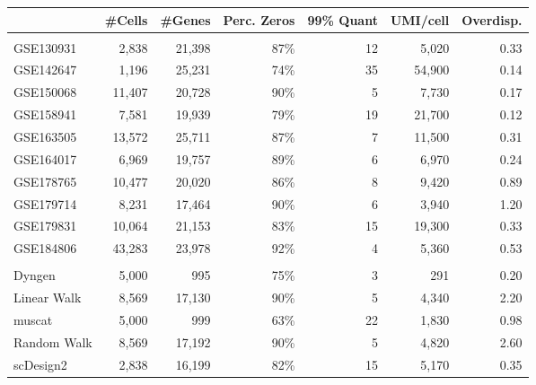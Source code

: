 \centering
\begin{tabular}[t]{lrrrrrr}
\toprule
  & \#Cells & \#Genes & Perc.
Zeros & 99\%
Quant & UMI/cell & Overdisp.\\
\midrule
\addlinespace[0mm]
\multicolumn{7}{l}{\textbf{Consistency}}\\
\hspace{1em}GSE130931 & 2,838 & 21,398 & 87\% & 12 & 5,020 & 0.33\\
\hspace{1em}GSE142647 & 1,196 & 25,231 & 74\% & 35 & 54,900 & 0.14\\
\hspace{1em}GSE150068 & 11,407 & 20,728 & 90\% & 5 & 7,730 & 0.17\\
\hspace{1em}GSE158941 & 7,581 & 19,939 & 79\% & 19 & 21,700 & 0.12\\
\hspace{1em}GSE163505 & 13,572 & 25,711 & 87\% & 7 & 11,500 & 0.31\\
\hspace{1em}GSE164017 & 6,969 & 19,757 & 89\% & 6 & 6,970 & 0.24\\
\hspace{1em}GSE178765 & 10,477 & 20,020 & 86\% & 8 & 9,420 & 0.89\\
\hspace{1em}GSE179714 & 8,231 & 17,464 & 90\% & 6 & 3,940 & 1.20\\
\hspace{1em}GSE179831 & 10,064 & 21,153 & 83\% & 15 & 19,300 & 0.33\\
\hspace{1em}GSE184806 & 43,283 & 23,978 & 92\% & 4 & 5,360 & 0.53\\
\addlinespace[3mm]
\multicolumn{7}{l}{\textbf{Simulation}}\\
\hspace{1em}Dyngen & 5,000 & 995 & 75\% & 3 & 291 & 0.20\\
\hspace{1em}Linear Walk & 8,569 & 17,130 & 90\% & 5 & 4,340 & 2.20\\
\hspace{1em}muscat & 5,000 & 999 & 63\% & 22 & 1,830 & 0.98\\
\hspace{1em}Random Walk & 8,569 & 17,192 & 90\% & 5 & 4,820 & 2.60\\
\hspace{1em}scDesign2 & 2,838 & 16,199 & 82\% & 15 & 5,170 & 0.35\\

\end{tabular}
